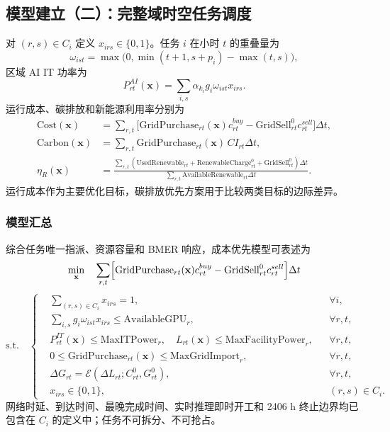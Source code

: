 \subsection{模型建立（二）：完整域时空任务调度}

对 $(r,s)\in C_i$ 定义 $x_{irs}\in\{0,1\}$。任务 $i$ 在小时 $t$ 的重叠量为
\begin{equation}
\omega_{ist}=\max\bigl(0,\min(t+1,s+p_i)-\max(t,s)\bigr),
\end{equation}
区域 AI IT 功率为
\begin{equation}
P^{AI}_{rt}(\mathbf x)=\sum_{i,s}\alpha_{k_i}g_i\omega_{ist}x_{irs}.
\label{eq:q2-ai-power}
\end{equation}
运行成本、碳排放和新能源利用率分别为
\begin{align}
\mathrm{Cost}(\mathbf x)&=\sum_{r,t}\bigl[\mathrm{GridPurchase}_{rt}(\mathbf x)c^{buy}_{rt}-\mathrm{GridSell}^0_{rt}c^{sell}_{rt}\bigr]\Delta t,\label{eq:q2-cost}\\
\mathrm{Carbon}(\mathbf x)&=\sum_{r,t}\mathrm{GridPurchase}_{rt}(\mathbf x)\,CI_{rt}\Delta t,\label{eq:q2-carbon}\\
\eta_R(\mathbf x)&=\frac{\sum_{r,t}(\mathrm{UsedRenewable}_{rt}+\mathrm{RenewableCharge}^0_{rt}+\mathrm{GridSell}^0_{rt})\Delta t}{\sum_{r,t}\mathrm{AvailableRenewable}_{rt}\Delta t}.\label{eq:q2-eta-r}
\end{align}
运行成本作为主要优化目标，碳排放优先方案用于比较两类目标的边际差异\cite{hanafy_carbonscaler_2023}。

\subsubsection{模型汇总}

综合任务唯一指派、资源容量和 BMER 响应，成本优先模型可表述为
\begin{equation}
\min_{\mathbf x}\quad
\sum_{r,t}\Bigl[\mathrm{GridPurchase}_{rt}(\mathbf x)c^{buy}_{rt}-\mathrm{GridSell}^0_{rt}c^{sell}_{rt}\Bigr]\Delta t
\label{eq:q2-summary-obj}
\end{equation}
\begin{equation}
\mathrm{s.t.}\quad
\left\{
\begin{aligned}
&\sum_{(r,s)\in C_i}x_{irs}=1,&&\forall i,\\
&\sum_{i,s}g_i\omega_{ist}x_{irs}\le\mathrm{AvailableGPU}_r,&&\forall r,t,\\
&P^{IT}_{rt}(\mathbf x)\le\mathrm{MaxITPower}_r,\quad
L_{rt}(\mathbf x)\le\mathrm{MaxFacilityPower}_r,&&\forall r,t,\\
&0\le \mathrm{GridPurchase}_{rt}(\mathbf x)\le\mathrm{MaxGridImport}_r,&&\forall r,t,\\
&\Delta G_{rt}=\mathcal E(\Delta L_{rt};C^0_{rt},G^0_{rt}),&&\forall r,t,\\
&x_{irs}\in\{0,1\},&&(r,s)\in C_i.
\end{aligned}
\right.
\label{eq:q2-summary-con}
\end{equation}
网络时延、到达时间、最晚完成时间、实时推理即时开工和 2406 h 终止边界均已包含在 $C_i$ 的定义中；任务不可拆分、不可抢占。

